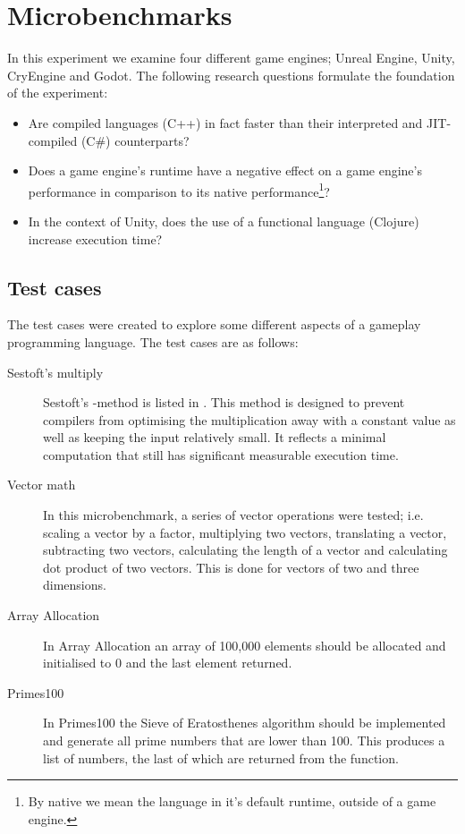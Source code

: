 \section{Microbenchmarks} \label{sec:microbenchmarks}
In this experiment we examine four different game engines; Unreal Engine, Unity, CryEngine and Godot. The following research questions formulate the foundation of the experiment:
\begin{itemize}
    \item Are compiled languages (C++) in fact faster than their interpreted and \ac{JIT}-compiled (C\#) counterparts?
    \item Does a game engine's runtime have a negative effect on a game engine's performance in comparison to its native performance\footnote{By native we mean the language in it's default runtime, outside of a game engine.}?
    \item In the context of Unity, does the use of a functional language (Clojure) increase execution time?
\end{itemize}

\subsection{Test cases}
The test cases were created to explore some different aspects of a gameplay programming language. The test cases are as follows: 
\begin{description} 
    \item[Sestoft's multiply] Sestoft's -method is listed in . This method is designed to prevent compilers from optimising the multiplication away with a constant value as well as keeping the input relatively small. It reflects a minimal computation that still has significant measurable execution time.
    \item[Vector math] In this microbenchmark, a series of vector operations were tested; i.e. scaling a vector by a factor, multiplying two vectors, translating a vector, subtracting two vectors, calculating the length of a vector and calculating dot product of two vectors. This is done for vectors of two and three dimensions.
    \item[Array Allocation] In Array Allocation an array of 100,000 elements should be allocated and initialised to 0 and the last element returned.
    \item[Primes100] In Primes100 the Sieve of Eratosthenes algorithm\cite{eratosthenes:sieve} should be implemented and generate all prime numbers that are lower than 100. This produces a list of numbers, the last of which are returned from the function. 
\end{description}

